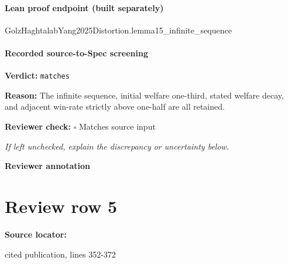 \documentclass[10pt]{article}
\newcommand{\reviewerbox}{%
  \par\noindent\fbox{\parbox{0.96\linewidth}{\rule{0pt}{0.38in}}}\par
}
\newcommand{\reviewmatch}[1]{%
  \par\noindent\textbf{Reviewer check:} $\square$\; #1\par
  \noindent\emph{If left unchecked, explain the discrepancy or uncertainty below.}\par
}
\begin{document}
\paragraph{Lean proof endpoint (built separately)}\begin{ReviewVerbatim}
GolzHaghtalabYang2025Distortion.lemma15_infinite_sequence
\end{ReviewVerbatim}

\paragraph{Recorded source-to-Spec screening}
\textbf{Verdict:} \texttt{matches}
\\
{\raggedright
\textbf{Reason:} The infinite sequence, initial welfare one-\allowbreak{}third, stated welfare decay, and adjacent win-\allowbreak{}rate strictly above one-\allowbreak{}half are all retained.\allowbreak{}
\par}
\reviewmatch{Matches source input}
\noindent\textbf{Reviewer annotation}\par
\reviewerbox
\clearpage
\hypertarget{source-claim-c85b480e847e3345}{}
\section*{Review row 5}
\textbf{Source locator:} {\footnotesize\raggedright cited publication, lines 352-\allowbreak{}372\par}
\end{document}
